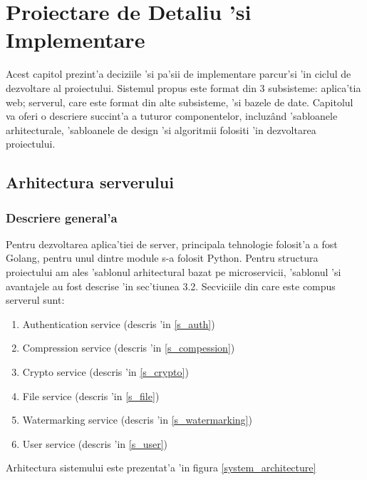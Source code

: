 \documentclass[12pt,a4paper,twoside]{report}
\begin{document}
\chapter{Proiectare de Detaliu 'si Implementare}
Acest capitol prezint'a deciziile 'si pa'sii de implementare parcur'si 'in ciclul de dezvoltare al proiectului. Sistemul propus este format din 3 subsisteme: aplica'tia web; serverul, care este format din alte subsisteme, 'si bazele de date. Capitolul va oferi o descriere succint'a a tuturor componentelor, incluzând 'sabloanele arhitecturale, 'sabloanele de design 'si algoritmii folositi 'in dezvoltarea proiectului.
\section{Arhitectura serverului}
\subsection{Descriere general'a}
Pentru dezvoltarea aplica'tiei de server, principala tehnologie folosit'a a fost Golang, pentru unul dintre module s-a folosit Python.
Pentru structura proiectului am ales 'sablonul arhitectural bazat pe microservicii, 'sablonul 'si avantajele au fost descrise 'in sec'tiunea 3.2.
Secviciile din care este compus serverul sunt:
\begin{enumerate}
\item Authentication service (descris 'in \ref{s_auth})
\item Compression service  (descris 'in \ref{s_compession})
\item Crypto service  (descris 'in \ref{s_crypto})
\item File service  (descris 'in \ref{s_file})
\item Watermarking service  (descris 'in \ref{s_watermarking})
\item User service  (descris 'in \ref{s_user})
\end{enumerate}
Arhitectura sistemului este prezentat'a 'in figura \ref{system_architecture}
\end{document}
